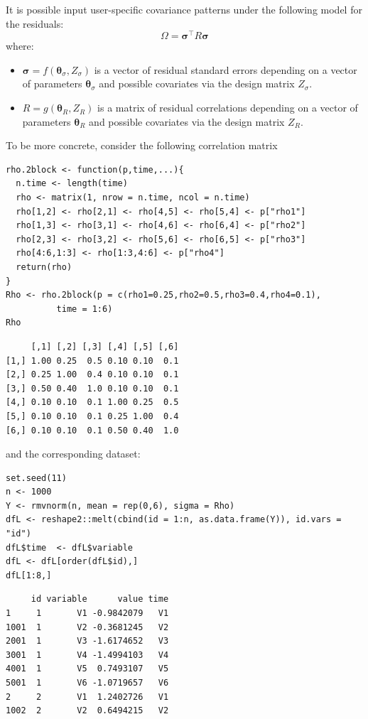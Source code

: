 \documentclass[12pt]{article}
\newcommand\trans[1]{{#1}^\intercal}%
\begin{document}
It is possible input user-specific covariance patterns under the
following model for the residuals: \[\Omega =
\trans{\boldsymbol{\sigma}} R \boldsymbol{\sigma}\] where:
\begin{itemize}
\item \(\boldsymbol{\sigma}=f(\boldsymbol{\theta}_{\sigma},Z_{\sigma})\)
is a vector of residual standard errors depending on a vector of
parameters \(\boldsymbol{\theta}_{\sigma}\) and possible covariates
via the design matrix \(Z_{\sigma}\).
\item \(R=g(\boldsymbol{\theta}_{R},Z_R)\) is a matrix of residual
correlations depending on a vector of parameters
\(\boldsymbol{\theta}_{R}\) and possible covariates via the design
matrix \(Z_R\).
\end{itemize}

\bigskip

To be more concrete, consider the following correlation matrix
\lstset{language=r,label= ,caption= ,captionpos=b,numbers=none}
\begin{lstlisting}
rho.2block <- function(p,time,...){
  n.time <- length(time)
  rho <- matrix(1, nrow = n.time, ncol = n.time)
  rho[1,2] <- rho[2,1] <- rho[4,5] <- rho[5,4] <- p["rho1"]
  rho[1,3] <- rho[3,1] <- rho[4,6] <- rho[6,4] <- p["rho2"]
  rho[2,3] <- rho[3,2] <- rho[5,6] <- rho[6,5] <- p["rho3"]
  rho[4:6,1:3] <- rho[1:3,4:6] <- p["rho4"]
  return(rho)
}
Rho <- rho.2block(p = c(rho1=0.25,rho2=0.5,rho3=0.4,rho4=0.1),
		  time = 1:6)
Rho
\end{lstlisting}

\begin{verbatim}
     [,1] [,2] [,3] [,4] [,5] [,6]
[1,] 1.00 0.25  0.5 0.10 0.10  0.1
[2,] 0.25 1.00  0.4 0.10 0.10  0.1
[3,] 0.50 0.40  1.0 0.10 0.10  0.1
[4,] 0.10 0.10  0.1 1.00 0.25  0.5
[5,] 0.10 0.10  0.1 0.25 1.00  0.4
[6,] 0.10 0.10  0.1 0.50 0.40  1.0
\end{verbatim}


and the corresponding dataset:
\lstset{language=r,label= ,caption= ,captionpos=b,numbers=none}
\begin{lstlisting}
set.seed(11)
n <- 1000
Y <- rmvnorm(n, mean = rep(0,6), sigma = Rho)
dfL <- reshape2::melt(cbind(id = 1:n, as.data.frame(Y)), id.vars = "id")
dfL$time  <- dfL$variable
dfL <- dfL[order(dfL$id),]
dfL[1:8,]
\end{lstlisting}

\begin{verbatim}
     id variable      value time
1     1       V1 -0.9842079   V1
1001  1       V2 -0.3681245   V2
2001  1       V3 -1.6174652   V3
3001  1       V4 -1.4994103   V4
4001  1       V5  0.7493107   V5
5001  1       V6 -1.0719657   V6
2     2       V1  1.2402726   V1
1002  2       V2  0.6494215   V2
\end{verbatim}
\end{document}
